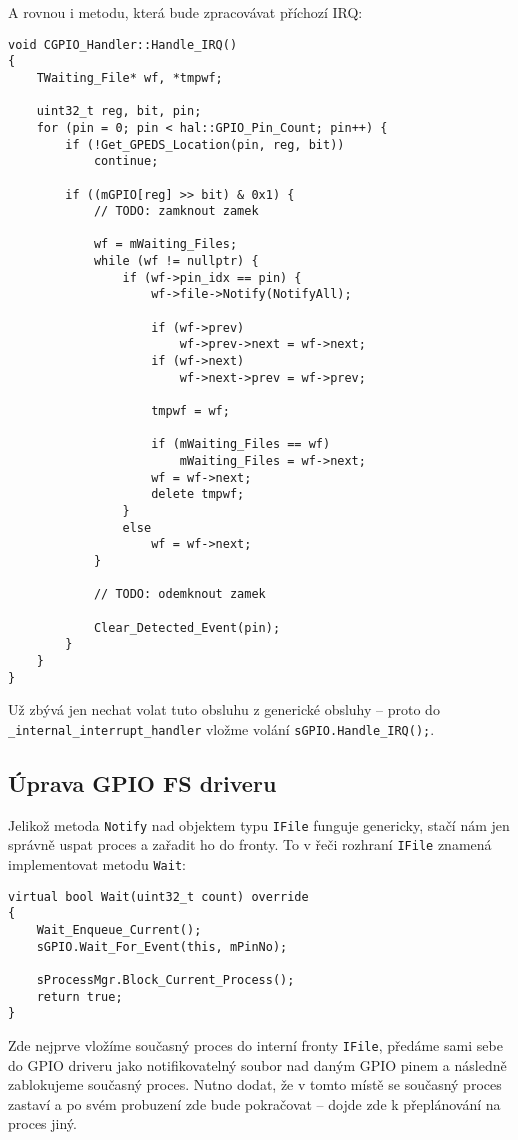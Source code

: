 \documentclass{article}
\begin{document}
A rovnou i metodu, která bude zpracovávat příchozí IRQ:
\begin{lstlisting}
void CGPIO_Handler::Handle_IRQ()
{
	TWaiting_File* wf, *tmpwf;
	
	uint32_t reg, bit, pin;
	for (pin = 0; pin < hal::GPIO_Pin_Count; pin++) {
		if (!Get_GPEDS_Location(pin, reg, bit))
			continue;
		
		if ((mGPIO[reg] >> bit) & 0x1) {
			// TODO: zamknout zamek
			
			wf = mWaiting_Files;
			while (wf != nullptr) {
				if (wf->pin_idx == pin) {
					wf->file->Notify(NotifyAll);
					
					if (wf->prev)
						wf->prev->next = wf->next;
					if (wf->next)
						wf->next->prev = wf->prev;
					
					tmpwf = wf;
					
					if (mWaiting_Files == wf)
						mWaiting_Files = wf->next;
					wf = wf->next;
					delete tmpwf;
				}
				else
					wf = wf->next;
			}
			
			// TODO: odemknout zamek
			
			Clear_Detected_Event(pin);
		}
	}
}
\end{lstlisting}

Už zbývá jen nechat volat tuto obsluhu z generické obsluhy -- proto do \texttt{\_internal\_interrupt\_handler} vložme volání \texttt{sGPIO.Handle\_IRQ();}.

\subsection{Úprava GPIO FS driveru}

Jelikož metoda \texttt{Notify} nad objektem typu \texttt{IFile} funguje genericky, stačí nám jen správně uspat proces a zařadit ho do fronty. To v řeči rozhraní \texttt{IFile} znamená implementovat metodu \texttt{Wait}:
\begin{lstlisting}
virtual bool Wait(uint32_t count) override
{
	Wait_Enqueue_Current();
	sGPIO.Wait_For_Event(this, mPinNo);

	sProcessMgr.Block_Current_Process();
	return true;
}
\end{lstlisting}
Zde nejprve vložíme současný proces do interní fronty \texttt{IFile}, předáme sami sebe do GPIO driveru jako notifikovatelný soubor nad daným GPIO pinem a následně zablokujeme současný proces. Nutno dodat, že v tomto místě se současný proces zastaví a po svém probuzení zde bude pokračovat -- dojde zde k přeplánování na proces jiný.
\end{document}

